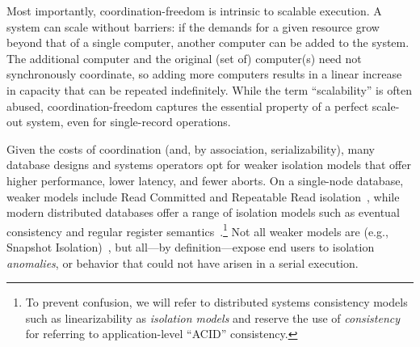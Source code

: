

 Most importantly,
coordination-freedom is intrinsic to scalable execution. A \cfree
system can scale without barriers: if the demands for a given resource
grow beyond that of a single computer, another computer can be added
to the system. The additional computer and the original (set of)
computer(s) need not synchronously coordinate, so adding more
computers results in a linear increase in capacity that can be
repeated indefinitely. While the term ``scalability'' is often abused,
coordination-freedom captures the essential property of a perfect
scale-out system, even for single-record operations.


 Given the costs of coordination (and, by
association, serializability), many database designs and systems
operators opt for weaker isolation models that offer higher
performance, lower latency, and fewer aborts. On a single-node
database, weaker models include Read Committed and Repeatable Read
isolation~\cite{adya-isolation}, while modern distributed databases
offer a range of isolation models such as eventual consistency and
regular register semantics~\cite{hat-vldb}.\footnote{To prevent
  confusion, we will refer to distributed systems consistency models
  such as linearizability as \textit{isolation models} and reserve the
  use of \textit{consistency} for referring to application-level
  ``ACID'' consistency.}  Not all weaker models are \cfree (e.g.,
Snapshot Isolation)~\cite{hat-vldb}, but all---by definition---expose
end users to isolation \textit{anomalies}, or behavior that could not
have arisen in a serial execution.

